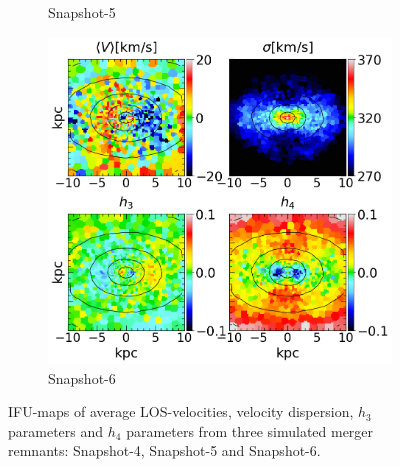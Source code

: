 \documentclass[english, oneside]{HYgradu}
\begin{document}
\begin{figure}
\begin{subfigure}[b]{0.49\textwidth}
		\caption{Snapshot-5}
	\end{subfigure}
	\begin{subfigure}[b]{0.49\textwidth}
		\includegraphics[width=\textwidth]{BH_6.png}
		\caption{Snapshot-6}
	\end{subfigure}
	\caption{IFU-maps of average LOS-velocities, velocity dispersion, $h_3$ parameters and $h_4$ parameters from three simulated merger remnants: Snapshot-4, Snapshot-5 and Snapshot-6.}
\end{figure}



\newcommand{\apj}{The Astrophysical Journal}
\newcommand{\mnras}{Monthly Notices of the Royal Astronomical Society}
\newcommand{\apjs}{The Astrophysical Journal Supplement}
\newcommand{\nat}{Nature}
\newcommand{\aj}{The Astronomical Journal}
\newcommand{\na}{New Astronomy}

\clearpage
{} %


\end{document}

